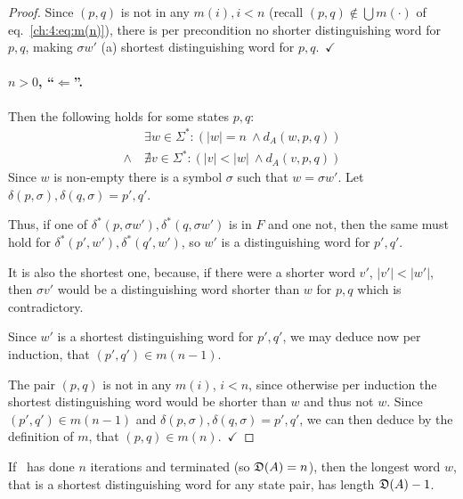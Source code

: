 \begin{proof}
Since $(p,q)$ is not in any $m(i), i<n$ (recall $(p,q) \notin \bigcup{m(\cdot)}$ of eq.~\ref{ch:4:eq:m(n)}), there is per precondition no shorter distinguishing word for $p,q$, making $\sigma w'$ (a) shortest distinguishing word for $p,q$.\ $\checkmark$ 

\paragraph*{$n > 0$, ``$\Leftarrow$''.} 
Then the following holds for some states $p,q$:
\begin{align*}
&\exists w\in\Sigma^*\colon (|w| = n\ \land d_A(w, p, q))\\
\land\ &\nexists v\in\Sigma^*\colon (|v| < |w|\ \land d_A(v, p, q))
\end{align*}
Since $w$ is non-empty there is a symbol $\sigma$ such that $w = \sigma w'$. Let $\delta(p,\sigma),\delta(q,\sigma) = p',q'$.

Thus, if one of $\delta^*(p, \sigma w'),\delta^*(q, \sigma w')$ is in $F$ and one not, then the same must hold for $\delta^*(p', w'),\delta^*(q', w')$, so $w'$ is a distinguishing word for $p',q'$.

It is also the shortest one, because, if there were a shorter word $v'$, $|v'| < |w'|$, then $\sigma v'$ would be a distinguishing word shorter than $w$ for $p,q$ which is contradictory.

Since $w'$ is a shortest distinguishing word for $p',q'$, we may deduce now per induction, that $(p',q')\in m(n-1)$.

The pair $(p,q)$ is not in any $m(i)$, $i<n$, since otherwise per induction the shortest distinguishing word would be shorter than $w$ and thus not $w$. Since $(p',q')\in m(n-1)$ and $\delta(p,\sigma),\delta(q,\sigma) = p',q'$, we can then deduce by the definition of $m$, that $(p,q)\in m(n)$.\ $\checkmark$ 
\end{proof}

\begin{lemma}\label{ch:4:semantics-of-D(A)}
    If \CompDist\ has done $n$ iterations and terminated (so $\mathfrak{D}(A) = n$), then the longest word $w$, that is a shortest distinguishing word for any state pair, has length $\mathfrak{D}(A)-1$.
\end{lemma}

